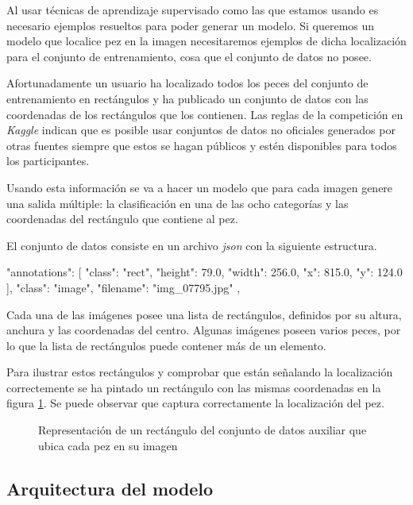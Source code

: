Al usar técnicas de aprendizaje supervisado como las que estamos usando es
necesario ejemplos resueltos para poder generar un modelo. Si queremos un modelo
que localice pez en la imagen necesitaremos ejemplos de dicha
localización para el conjunto de entrenamiento, cosa que el conjunto de datos no posee.

Afortunadamente un usuario ha localizado todos los peces del conjunto de
entrenamiento en rectángulos y ha publicado un conjunto de datos con las
coordenadas de los rectángulos que los contienen. Las reglas de la competición
en \textit{Kaggle} indican que es posible usar conjuntos de datos no oficiales
generados por otras fuentes siempre que estos se hagan públicos y estén
disponibles para todos los participantes.

Usando esta información se va a hacer un modelo que para cada imagen genere una
salida múltiple: la clasificación en una de las ocho categorías y las
coordenadas del rectángulo que contiene al pez.

El conjunto de datos consiste en un archivo \textit{json} con la siguiente estructura.

\begin{python}
{
    "annotations": [
        {
            "class": "rect",
            "height": 79.0,
            "width": 256.0,
            "x": 815.0,
            "y": 124.0
        }
    ],
    "class": "image",
    "filename": "img_07795.jpg"
},
\end{python}

Cada una de las imágenes posee una lista de rectángulos, definidos por su
altura, anchura y las coordenadas del centro. Algunas imágenes poseen varios
peces, por lo que la lista de rectángulos puede contener más de un elemento.

Para ilustrar estos rectángulos y comprobar que están señalando la localización
correctemente se ha pintado un rectángulo con las mismas coordenadas en la
figura \ref{box}. Se puede observar que captura correctamente la localización
del pez.


\begin{figure}
  \caption{Representación de un rectángulo del conjunto de datos auxiliar que ubica cada pez en su imagen}
\label{box}
\end{figure}


\subsection{Arquitectura del modelo}

